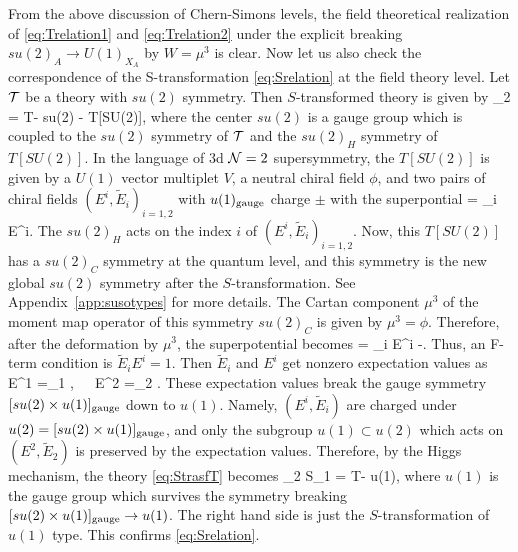 \documentclass[a4paper,11pt]{article}
\def\CN{{\cal N}}
\def\CT{{\cal T}}
\def\beq#1\eeq{\begin{align}#1\end{align}}
\begin{document}
From the above discussion of Chern-Simons levels, the field theoretical realization of \eqref{eq:Trelation1} and \eqref{eq:Trelation2} under the explicit breaking 
$su(2)_A \to U(1)_{X_A}  $ by $W =\mu^3$ is clear. Now let us also check the correspondence of the S-transformation \eqref{eq:Srelation} at the field theory level.
Let $\CT$ be a theory with $su(2)$ symmetry. Then $S$-transformed theory is given by
\beq
S_2 \cdot \CT = \CT - su(2) - T[SU(2)],\label{eq:StrasfT}
\eeq
where the center $su(2)$ is a gauge group which is coupled to the $su(2)$ symmetry of $\CT$ and the $su(2)_H$ symmetry of $T[SU(2)]$.
In the language of 3d $\CN=2$ supersymmetry, the $T[SU(2)]$ is given by a $U(1)$ vector multiplet $V$, a neutral chiral field $\phi$,
and two pairs of chiral fields $(E^i,\tilde{E}_i)_{i=1,2}$ with $u(1)_{\rm gauge}$ charge $\pm$ with the superpontial
\beq
W = \phi {}_i E^i.
\eeq 
The $su(2)_H$ acts on the index $i$ of $(E^i,\tilde{E}_i)_{i=1,2}$. 
Now, this $T[SU(2)]$ has a $su(2)_C$ symmetry at the quantum level, and this symmetry is the new global $su(2)$ symmetry after the $S$-transformation.
See Appendix~\ref{app:susotypes} for more details.
The Cartan component $\mu^3$ of the moment map operator of this symmetry $su(2)_C$ is given by $\mu^3=\phi$.
Therefore, after the deformation by $\mu^3$, the superpotential becomes
\beq
W = \phi {}_i E^i -\phi. 
\eeq
Thus, an F-term condition is $\tilde{E}_i E^i =1$. Then $\tilde{E}_i $ and $ E^i$ get nonzero expectation values as
\beq
\langle E^1 \rangle =\langle {}_1 ,~~~\langle E^2 \rangle =\langle {}_2 .
\eeq
These expectation values break the gauge symmetry $[su(2) \times u(1)]_{\rm gauge}$ down to $u(1)$.
Namely, $(E^i,\tilde{E}_i)$ are charged under $u(2) = [su(2) \times u(1)]_{\rm gauge}$, and only the subgroup $u(1) \subset u(2)$
which acts on $(E^2, \tilde{E}_2)$ is preserved by the expectation values.
Therefore, by the Higgs mechanism, the theory \eqref{eq:StrasfT} becomes
\beq
S_2 \cdot \CT \longrightarrow S_1 \cdot \CT = \CT - u(1),
\eeq
where $u(1)$ is the gauge group which survives the symmetry breaking $[su(2) \times u(1)]_{\rm gauge} \to u(1)$.
The right hand side is just the $S$-transformation of $u(1)$ type. This confirms \eqref{eq:Srelation}.
\end{document}
